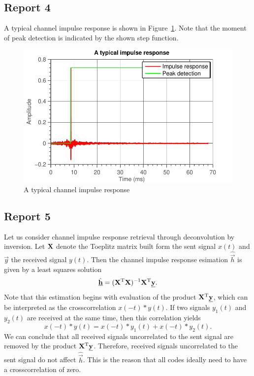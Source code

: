\documentclass[11pt,titlepage]{report}
\begin{document}
\subsection{Report 4}
A typical channel impulse response is shown in Figure~\ref{fig:ass-2-rep-4}. Note that the moment of peak detection is indicated by the shown step function.

\begin{figure}[H]
	\begin{center}
		\includegraphics[width=.6\linewidth]{../../deliverable-7-resources/figures/ass-2/report-4-5/ass-2-report-4.pdf}
	\end{center}
	\caption{A typical channel impulse response}
	\label{fig:ass-2-rep-4}
\end{figure}

\subsection{Report 5}
Let us consider channel impulse response retrieval through deconvolution by inversion. Let $\mathbf{X}$ denote the Toeplitz matrix built form the sent signal $x(t)$ and $\vec{y}$ the received signal $y(t)$. Then the channel impulse response esimation $\hat{\vec{h}}$ is given by a least squares solution
\[
	\hat{\mathbf{\underline{h}}} = (\mathbf{X}^{\text T} \mathbf{X})^{-1} \mathbf{X}^{\text T} \mathbf{\underline{y}}.
\]
Note that this estimation begins with evaluation of the product $\mathbf{X}^{\text T} \mathbf{\underline{y}}$, which can be interpreted as the crosscorrelation $x(-t) \ast y(t)$. If two signals $y_1(t)$ and $y_2(t)$ are received at the same time, then this correlation yields
\[
	x(-t) \ast y(t) = x(-t) \ast y_1(t) + x(-t) \ast y_2(t).
\]
We can conclude that all received signals uncorrelated to the sent signal are removed by the product $\mathbf{X}^{\text T} \mathbf{\underline{y}}$. Therefore, received signals uncorrelated to the sent signal do not affect $\hat{\vec{h}}$. This is the reason that all codes ideally need to have a crosscorrelation of zero.
\end{document}
